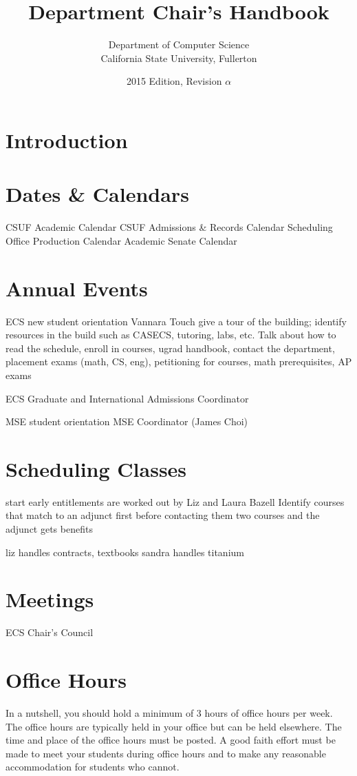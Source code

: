 \documentclass{book}
\begin{document}
\title{Department Chair's Handbook}
\author{Department of Computer Science \\ California State University, Fullerton}
\date{2015 Edition, Revision $\alpha$}
\maketitle

\newpage
\tableofcontents

\chapter{Introduction}

\chapter{Dates \& Calendars}
CSUF Academic Calendar
CSUF Admissions & Records Calendar
Scheduling Office Production Calendar
Academic Senate Calendar

\chapter{Annual Events}
ECS new student orientation
Vannara Touch
give a tour of the building; identify resources in the build such as CASECS, tutoring, labs, etc.
Talk about how to read the schedule, enroll in courses, ugrad handbook, contact the department, placement exams (math, CS, eng), petitioning for courses, math prerequisites, AP exams

ECS Graduate and International Admissions Coordinator

MSE student orientation
MSE Coordinator (James Choi)

\chapter{Scheduling Classes}
start early
entitlements are worked out by Liz and Laura Bazell
Identify courses that match to an adjunct first before contacting them
two courses and the adjunct gets benefits

liz handles contracts, textbooks
sandra handles titanium

\chapter{Meetings}
ECS Chair's Council

\chapter{Office Hours}
In a nutshell, you should hold a minimum of 3 hours of office hours per week. The office hours are typically held in your office but can be held elsewhere. The time and place of the office hours must be posted. A good faith effort must be made to meet your students during office hours and to make any reasonable accommodation for students who cannot.
\end{document}

